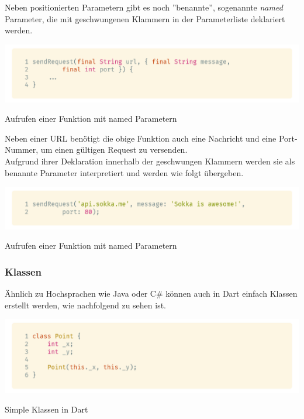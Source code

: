 \newpage

Neben positionierten Parametern gibt es noch ''benannte'', sogenannte \textit{named} Parameter, 
die mit geschwungenen Klammern in der Parameterliste deklariert werden.\\

\begin{code}
    \centering
    \includegraphics[width=1\textwidth]{images/Dart/dartNamedArguments.png}
    \caption{Aufrufen einer Funktion mit named Parametern}
\end{code}

Neben einer URL benötigt die obige Funktion auch eine Nachricht und eine Port-Nummer,
um einen gültigen Request zu versenden.\\
Aufgrund ihrer Deklaration innerhalb der geschwungen Klammern
werden sie als benannte Parameter interpretiert und werden wie folgt übergeben.

\begin{code}
    \centering
    \includegraphics[width=1\textwidth]{images/Dart/dartCallNamedArguments.png}
    \caption{Aufrufen einer Funktion mit named Parametern}
\end{code}

\newpage

\subsubsection{Klassen}

Ähnlich zu Hochsprachen wie Java oder C\# können auch in Dart einfach Klassen
erstellt werden, wie nachfolgend zu sehen ist.

\begin{code}
    \centering
    \includegraphics[width=1\textwidth]{images/Dart/dartClass.png}
    \caption{Simple Klassen in Dart}
\end{code}

